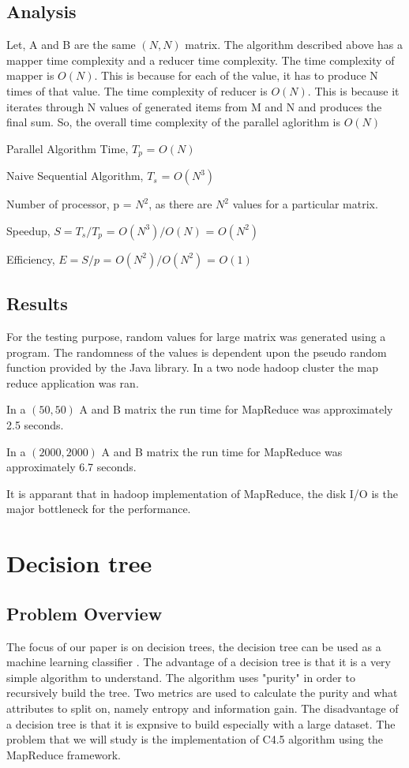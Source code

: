 \documentclass{article}
\begin{document}
\subsection{Analysis}
Let, A and B are the same $(N,N)$ matrix.
The algorithm described above has a mapper time complexity and a reducer time complexity.
The time complexity of mapper is ${O(N)}$. This is because for each of the value, it has to produce N times of that value.
The time complexity of reducer is ${O(N)}$. This is because it iterates through N values of generated items from M and N and produces the final sum.
So, the overall time complexity of the parallel aglorithm is ${O(N)}$\BlankLine

Parallel Algorithm Time, ${T_{p}}$ = ${O(N)}$

Naive Sequential Algorithm, ${T_{s}}$ = ${O(N^3)}$

Number of processor, p = ${N^2}$, as there are ${N^2}$ values for a particular matrix.

Speedup, ${S = T_{s}/T_{p}}$ = ${O(N^3)/O(N)}$ = ${O(N^2)}$

Efficiency, ${E = S/p}$ = ${O(N^2) / O(N^2)}$ = ${O(1)}$

\subsection{Results}
For the testing purpose, random values for large matrix was generated using a program. The randomness of the values is dependent upon the pseudo random function provided by the Java library. In a two node hadoop cluster the map reduce application was ran.\BlankLine

In a $(50,50)$ A and B matrix the run time for MapReduce was approximately 2.5 seconds.

In a $(2000,2000)$ A and B matrix the run time for MapReduce was approximately 6.7 seconds.

It is apparant that in hadoop implementation of MapReduce, the disk I/O is the major bottleneck for the performance.

\section{Decision tree}

\subsection{Problem Overview}
The focus of our paper is on decision trees, the decision tree can be used as a machine learning classifier \cite{quin1}.
The advantage of a decision tree is that it is a very simple algorithm to understand. The algorithm uses "purity" in order to recursively build the tree.
Two metrics are used to calculate the purity and what attributes to split on, namely entropy and information gain.
The disadvantage of a decision tree is that it is expnsive to build especially with a large dataset.
The problem that we will study is the implementation of C4.5 algorithm using the MapReduce framework.
\end{document}
